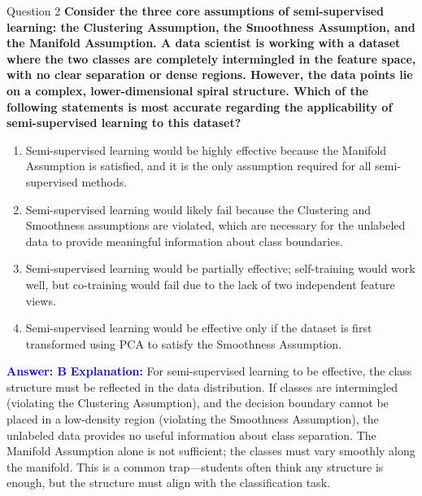 \documentclass[8pt]{beamer}  %
\begin{document}
	\begin{frame}{Question 2}
		\textbf{Consider the three core assumptions of semi-supervised learning: the Clustering Assumption, the Smoothness Assumption, and the Manifold Assumption. A data scientist is working with a dataset where the two classes are completely intermingled in the feature space, with no clear separation or dense regions. However, the data points lie on a complex, lower-dimensional spiral structure. Which of the following statements is most accurate regarding the applicability of semi-supervised learning to this dataset?}
		\begin{enumerate}
			\item Semi-supervised learning would be highly effective because the Manifold Assumption is satisfied, and it is the only assumption required for all semi-supervised methods.
			\item Semi-supervised learning would likely fail because the Clustering and Smoothness assumptions are violated, which are necessary for the unlabeled data to provide meaningful information about class boundaries.
			\item Semi-supervised learning would be partially effective; self-training would work well, but co-training would fail due to the lack of two independent feature views.
			\item Semi-supervised learning would be effective only if the dataset is first transformed using PCA to satisfy the Smoothness Assumption.
		\end{enumerate}
		\vspace{0.2cm}
		\textcolor{blue}{\textbf{Answer: B}}
		\vspace{0.2cm}
		\textcolor{blue}{\textbf{Explanation:}} For semi-supervised learning to be effective, the class structure must be reflected in the data distribution. If classes are intermingled (violating the Clustering Assumption), and the decision boundary cannot be placed in a low-density region (violating the Smoothness Assumption), the unlabeled data provides no useful information about class separation. The Manifold Assumption alone is not sufficient; the classes must vary smoothly along the manifold. This is a common trap—students often think any structure is enough, but the structure must align with the classification task.
	\end{frame}
	
\end{document}
